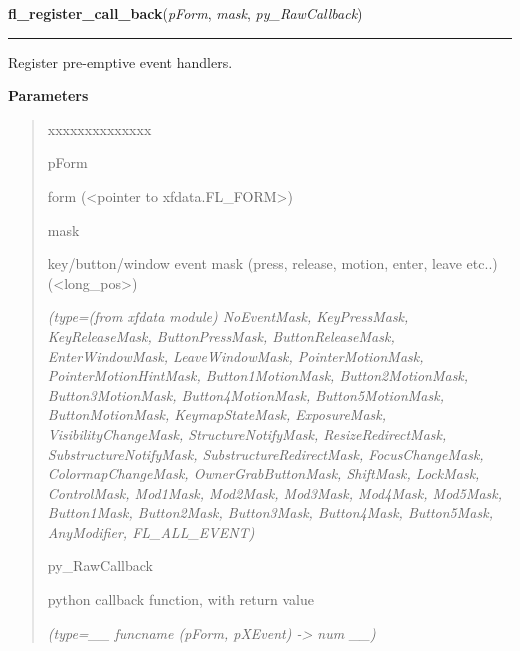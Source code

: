 \hspace{.8\funcindent}\begin{boxedminipage}{\funcwidth}

    \raggedright \textbf{fl\_register\_call\_back}(\textit{pForm}, \textit{mask}, \textit{py\_RawCallback})

    \vspace{-1.5ex}

    \rule{\textwidth}{0.5\fboxrule}
\setlength{\parskip}{2ex}
    Register pre-emptive event handlers.

\setlength{\parskip}{1ex}
      \textbf{Parameters}
      \vspace{-1ex}

      \begin{quote}
        \begin{Ventry}{xxxxxxxxxxxxxx}

          \item[pForm]

          form ({\textless}pointer to xfdata.FL\_FORM{\textgreater})

          \item[mask]

          key/button/window event mask (press, release, motion, enter, 
          leave etc..) ({\textless}long\_pos{\textgreater})

            {\it (type=(from xfdata module) NoEventMask, KeyPressMask, KeyReleaseMask, 
ButtonPressMask, ButtonReleaseMask, EnterWindowMask, LeaveWindowMask, 
PointerMotionMask, PointerMotionHintMask, Button1MotionMask, 
Button2MotionMask, Button3MotionMask, Button4MotionMask, Button5MotionMask,
ButtonMotionMask, KeymapStateMask, ExposureMask, VisibilityChangeMask, 
StructureNotifyMask, ResizeRedirectMask, SubstructureNotifyMask, 
SubstructureRedirectMask, FocusChangeMask, ColormapChangeMask, 
OwnerGrabButtonMask, ShiftMask, LockMask, ControlMask, Mod1Mask, Mod2Mask, 
Mod3Mask, Mod4Mask, Mod5Mask, Button1Mask, Button2Mask, Button3Mask, 
Button4Mask, Button5Mask, AnyModifier, FL\_ALL\_EVENT)}

          \item[py\_RawCallback]

          python callback function, with return value

            {\it (type=\_\_ funcname (pForm, pXEvent) -{\textgreater} num \_\_)}

        \end{Ventry}

      \end{quote}


\end{boxedminipage}

